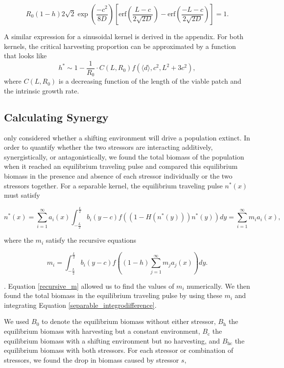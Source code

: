 \documentclass[12pt,english]{article}
\begin{document}
\begin{spacing}{1.9}
\begin{flushleft}
\[R_0(1-h)2\sqrt{2}\exp\left(\frac{-c^2}{8D}\right)\left[\text{erf}\left(\frac{L-c}{2\sqrt{2D}}\right)-\text{erf}\left(\frac{-L-c}{2\sqrt{2D}}\right)\right]=1.\]

A similar expression for a sinusoidal kernel is derived in the appendix.  For both kernels, the critical harvesting proportion can be approximated by a function that looks like 
\begin{equation}
h^*\sim1- \frac{1}{R_0}\cdot C(L,R_0)f(\langle d \rangle,c^2,L^2+3c^2),
\end{equation}
where $C(L,R_0)$ is a decreasing function of the length of the viable patch and the intrinsic growth rate.
   

\subsection{Calculating Synergy }

\citet{ZhouKot2011} only considered whether a shifting environment will drive a population extinct.   In order to quantify whether the two stressors are interacting additively, synergistically, or antagonistically, we found the total biomass of the population when it reached an equilibrium traveling pulse and 
compared this equilibrium biomass in the presence and absence of each stressor individually or the two stressors together.  For a separable kernel, the equilibrium traveling pulse $n^*(x)$ must satisfy 

\begin{equation}
n^*(x)=\sum^\infty_{i=1}
a_i(x)\int^{\frac{L}{2}}_{-\frac{L}{2}}b_i(y-c)f((1-H(n^*(y)))n^*(y))dy=\sum^\infty_{i=1}m_ia_i(x), \label{separable_integrodifference}
\end{equation}

\noindent where the $m_i$ satisfy the recursive equations

\begin{equation}
m_i=\int^{\frac{L}{2}}_{-\frac{L}{2}}b_i(y-c)f\left((1-h)\sum^\infty_{j=1}m_ja_j(x)\right)
dy. \label{recursive_m}
\end{equation}

\noindent \citep{Latore:1998fk}. Equation \ref{recursive_m} allowed us to find the values of $m_i$ numerically. We then found the total biomass in the 
equilibrium traveling pulse by using these $m_i$ and integrating Equation \ref{separable_integrodifference}.


We used $B_0$ to denote the equilibrium biomass 
without either stressor, $B_\text{h}$ the equilibrium biomass with harvesting but a constant environment, $B_\text{c}$ the 
equilibrium biomass with a shifting environment but no harvesting, and $B_\text{hc}$ the equilibrium biomass with 
both stressors. For each stressor or combination of stressors, we found the drop in  biomass caused 
by stressor $s$,


\end{flushleft}
\end{spacing}
\end{document}

